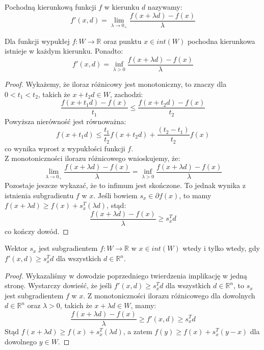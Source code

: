 \documentclass[10pt,a4paper,draft]{report}
\begin{document}
\begin{definition}
Pochodną kierunkową funkcji $f$ w kierunku $d$ nazywamy:
\[
f'(x, d) = \lim_{\lambda \rightarrow 0_+} \frac{f(x + \lambda d) - f(x)}{\lambda}
\]
\end{definition}

\begin{theorem}
Dla funkcji wypukłej $f : W \rightarrow \mathbb{R}$ oraz punktu $x \in int(W)$ pochodna kierunkowa istnieje w każdym kierunku. Ponadto:
\[
f'(x,d) = \inf_{\lambda >0} \frac{f(x + \lambda d) - f(x)}{\lambda}
\]
\end{theorem}
\begin{proof}
Wykażemy, że iloraz różnicowy jest monotoniczny, to znaczy dla $0 < t_1 < t_2$, takich że $x + t_2 d \in W$, zachodzi:
\[
\frac{f(x + t_1 d) - f(x)}{ t_1} \leq \frac{f(x + t_2 d) - f(x)}{t_2}
\]
Powyższa nierówność jest równoważna:
\[
f(x + t_1 d) \leq \frac{t_1}{t_2} f(x + t_2 d) + \frac{(t_2 - t_1)}{t_2} f(x)
\]
co wynika wprost z wypukłości funkcji $f$.
\\
Z monotoniczności ilorazu różnicowego wnioskujemy, że:
\[
\lim_{\lambda \rightarrow 0_+} \frac{f(x + \lambda d) - f(x)}{\lambda} = \inf_{\lambda > 0} \frac{f(x + \lambda d) - f(x)}{\lambda}
\]
Pozostaje jeszcze wykazać, że to infimum jest skończone. To jednak wynika z istnienia subgradientu $f$ w $x$. Jeśli bowiem $s_x \in \partial f(x)$, to mamy $f(x + \lambda d) \geq f(x) + s_x^T(\lambda d)$, stąd:
\[
\frac{f(x + \lambda d) - f(x)}{\lambda} \geq s_x^T d
\]
co kończy dowód.
\end{proof}

\begin{theorem}
Wektor $s_x$ jest subgradientem $f: W \rightarrow \mathbb{R}$ w $x \in int(W)$ wtedy i tylko wtedy, gdy $f'(x,d) \geq s_x^T d$ dla wszystkich $d \in \mathbb{R}^n$.
\end{theorem}
\begin{proof}
Wykazaliśmy w dowodzie poprzedniego twierdzenia implikację w jedną stronę. Wystarczy dowieść, że jeśli $f'(x,d) \geq s_x^T d$ dla wszystkich $d \in \mathbb{R}^n$, to $s_x$ jest subgradientem $f$ w $x$. Z monotoniczności ilorazu różnicowego dla dowolnych $d \in \mathbb{R}^n$ oraz $\lambda > 0$, takich że $x + \lambda d \in W$, mamy:
\[
\frac{f(x + \lambda d) - f(x)}{\lambda} \geq f'(x,d) \geq s_x^T d
\]
Stąd $f(x + \lambda d) \geq f(x) + s_x^T( \lambda d)$, a zatem $f(y) \geq f(x) + s_x^T(y - x)$ dla dowolnego $y \in W$.
\end{proof}
\end{document}
